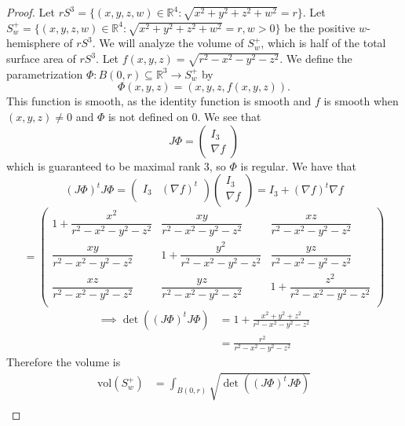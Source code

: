 \documentclass{article}
\newcommand{\vol}{\mathrm{vol}}
\theoremstyle{plain} %
\numberwithin{thm}{section} %
\theoremstyle{definition}
\begin{document}
\begin{proof}
    Let \(rS^3 = \{ (x,y,z,w) \in \mathbb{R}^4 : \sqrt{x^2 + y^2 + z^2 + w^2} = r\}\). Let \(S_w^+ = \{ (x,y,z,w) \in \mathbb{R}^4 : \sqrt{x^2 + y^2 + z^2 + w^2} = r, w > 0\}\) be the positive \(w\)-hemisphere of \(rS^3\). We will analyze the volume of \(S_w^+\), which is half of the total surface area of \(rS^3\). Let \(f(x,y,z) = \sqrt{r^2 - x^2 - y^2 - z^2}\). We define the parametrization \(\Phi: B(0, r) \subseteq \mathbb{R}^3 \to S_w^+\) by
    \[
        \Phi (x,y,z) = (x,y,z, f(x,y,z)).
    \]
    This function is smooth, as the identity function is smooth and \(f\) is smooth when \((x,y,z) \neq 0\) and \(\Phi\) is not defined on \(0\). We see that
    \[
        J \Phi = \begin{pmatrix}
            I_3 \\
            \nabla f
        \end{pmatrix}
    \]
    which is guaranteed to be maximal rank 3, so \(\Phi\) is regular. We have that
    \[
        (J \Phi)^t J \Phi = \begin{pmatrix}
            I_3 &  (\nabla f)^t \\
        \end{pmatrix}
        \begin{pmatrix}
             I_3 \\
             \nabla f \\
        \end{pmatrix}
        = I_3 + (\nabla f)^t \nabla f
    \]
    \[
        = \begin{pmatrix}
            1 + \dfrac{x^2}{r^2 - x^2 - y^2 - z^2} & \dfrac{xy}{r^2 - x^2 - y^2 - z^2} & \dfrac{xz}{r^2 - x^2 - y^2 - z^2}  \\
            \dfrac{xy}{r^2 - x^2 - y^2 - z^2} & 1 + \dfrac{y^2}{r^2 - x^2 - y^2 - z^2} & \dfrac{yz}{r^2 - x^2 - y^2 - z^2}  \\
            \dfrac{xz}{r^2 - x^2 - y^2 - z^2} & \dfrac{yz}{r^2 - x^2 - y^2 - z^2} & 1 + \dfrac{z^2}{r^2 - x^2 - y^2 - z^2}  \\
        \end{pmatrix}
    \]
    \begin{align*}
        \implies \det ((J \Phi)^t J \Phi) &= 1 + \frac{x^2 + y^2 + z^2}{r^2 - x^2 - y^2 - z^2} \tag{trust} \\
        &= \frac{r^2}{r^2 - x^2 - y^2 - z^2}
    \end{align*}
    Therefore the volume is
    \begin{align*}
        \vol(S_w^+) &= \int _{B(0,r)}\sqrt{\det ((J \Phi)^t J \Phi)} \\

\end{align*}
\end{proof}
\end{document}

